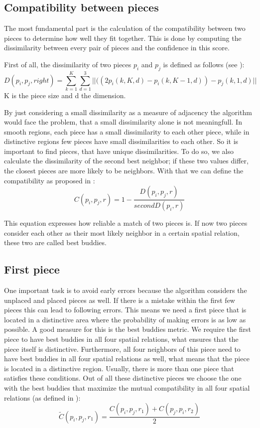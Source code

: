 \documentclass[11pt]{report}
\begin{document}
\subsection{Compatibility between pieces}
The most fundamental part is the calculation of the compatibility between two pieces to determine how well they fit together. This is done by computing the dissimilarity between every pair of pieces and the confidence in this score.

First of all, the dissimilarity of two pieces $p_i$ and $p_j$ is defined as follows (see \cite{Paikin2015}): 
\begin{equation}\label{eq:dissimilarity}
D(p_i,p_j,right) = \sum_{k=1}^K \sum_{d=1}^3 ||((2p_i(k,K,d) - p_i(k,K-1,d)) - p_j(k,1,d) ||
\end{equation}
K is the piece size and d the dimension.

By just considering a small dissimilarity as a measure of adjacency the
algorithm would face the problem, that a small dissimilarity alone is not
meaningfull. In smooth regions, each piece has a small dissimilarity to each
other piece, while in distinctive regions few pieces have small dissimilarities
to each other. So it is important to find pieces, that have unique
dissimilarities. To do so, we also calculate the dissimilarity of the second best neighbor; if these two values differ, the closest pieces are more likely to be neighbors. With that we can define the compatibility as proposed in \cite{Paikin2015}:
\begin{equation}\label{eq:compatibility}
C(p_i,p_j,r) = 1 - \frac{D(p_i,p_j,r)}{secondD(p_i,r)}
\end{equation}

This equation expresses how reliable a match of two pieces is. If now two pieces consider each other as their most likely neighbor in a certain spatial relation, these two are called best buddies.

\subsection{First piece}
One important task is to avoid early errors because the algorithm considers the unplaced and placed pieces as well. If there is a mistake within the first few pieces this can lead to following errors.
This means we need a first piece that is located in a distinctive area where the probability of making errors is as low as possible. A good measure for this is the best buddies metric. We require the first piece to have best buddies in all four spatial relations, what ensures that the piece itself is distinctive. Furthermore, all four neighbors of this piece need to have best buddies in all four spatial relations as well, what means that the piece is located in a distinctive region. 
Usually, there is more than one piece that satisfies these conditions. Out of all these distinctive pieces we choose the one with the best buddies that maximize the mutual compatibility in all four spatial relations (as defined in \cite{Paikin2015}):
\begin{equation}\label{eq:mutualComp}
\widetilde{C}(p_i,p_j,r_1) = \frac{C(p_i,p_j,r_1)+C(p_j,p_i,r_2)}{2}
\end{equation}
\end{document}
